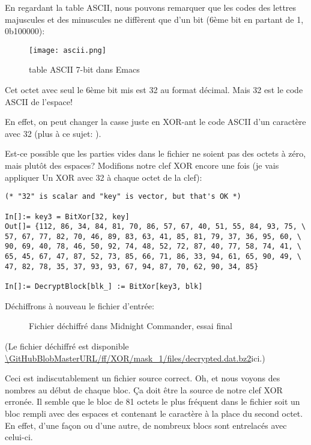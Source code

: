 En regardant la table ASCII, nous pouvons remarquer que les codes des lettres majuscules
et des minuscules ne diffèrent que d'un bit (6ème bit en partant de 1, 0b100000):

\begin{figure}[H]
\centering
\texttt{[image: ascii.png]}
\caption{table \ac{ASCII} 7-bit dans Emacs}
\end{figure}

Cet octet avec seul le 6ème bit mis est 32 au format décimal.
Mais 32 est le code ASCII de l'espace!

En effet, on peut changer la casse juste en XOR-ant le code ASCII d'un caractère
avec 32 (plus à ce sujet: ).

Est-ce possible que les parties vides dans le fichier ne soient pas des octets à zéro,
mais plutôt des espaces?
Modifions notre clef XOR encore une fois (je vais appliquer Un XOR avec 32 à chaque
octet de la clef):

\begin{lstlisting}[style=custommath]
(* "32" is scalar and "key" is vector, but that's OK *)

In[]:= key3 = BitXor[32, key]
Out[]= {112, 86, 34, 84, 81, 70, 86, 57, 67, 40, 51, 55, 84, 93, 75, \
57, 67, 77, 82, 70, 46, 89, 83, 63, 41, 85, 81, 79, 37, 36, 95, 60, \
90, 69, 40, 78, 46, 50, 92, 74, 48, 52, 72, 87, 40, 77, 58, 74, 41, \
65, 45, 67, 47, 87, 52, 73, 85, 66, 71, 86, 33, 94, 61, 65, 90, 49, \
47, 82, 78, 35, 37, 93, 93, 67, 94, 87, 70, 62, 90, 34, 85}

In[]:= DecryptBlock[blk_] := BitXor[key3, blk]
\end{lstlisting}

Déchiffrons à nouveau le fichier d'entrée:

\begin{figure}[H]
\centering
{}
\caption{Fichier déchiffré dans Midnight Commander, essai final}
\end{figure}

(Le fichier déchiffré est disponible
\url{\GitHubBlobMasterURL/ff/XOR/mask_1/files/decrypted.dat.bz2}{ici}.)

Ceci est indiscutablement un fichier source correct.
Oh, et nous voyons des nombres au début de chaque bloc. Ça doit être la source de
notre clef XOR erronée.
Il semble que le bloc de 81 octets le plus fréquent dans le fichier soit un bloc
rempli avec des espaces et contenant le caractère  à la place du second octet.
En effet, d'une façon ou d'une autre, de nombreux blocs sont entrelacés avec celui-ci.

